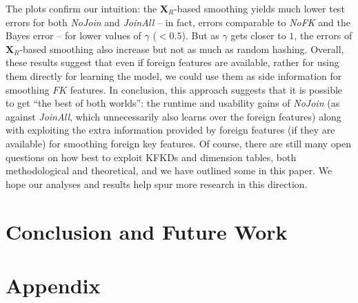 \documentclass{vldb}
\begin{document}
The plots confirm our intuition: the $\textbf{X}_R$-based smoothing yields much lower test errors for both \textit{NoJoin} and \textit{JoinAll} -- in 
fact, errors comparable to \textit{NoFK} and the Bayes error -- for lower values of $\gamma$ ($<0.5$). But as $\gamma$ gets closer to $1$, the 
errors of $\textbf{X}_R$-based smoothing also increase but not as much as random hashing. Overall, these results suggest that even if foreign features 
are available, rather for using them directly for learning the model, we could use them as side information for smoothing $FK$ features. In conclusion,
this approach suggests that it is possible to get ``the best of both worlds'': the runtime and usability gains of \textit{NoJoin} (as against \textit{JoinAll}, 
which unnecessarily also learns over the foreign features) along with exploiting the extra information provided by foreign features (if they are available)
for smoothing foreign key features. Of course, there are still many open questions on how best to exploit KFKDs and dimension tables, both methodological
and theoretical, and we have outlined some in this paper. We hope our analyses and results help spur more research in this direction.

\section{Conclusion and Future Work}


\section*{Appendix}
\appendix
\end{document}
